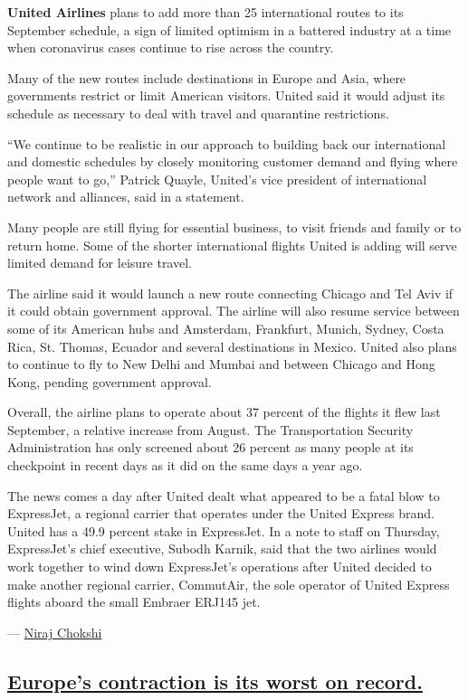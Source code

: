 \textbf{United Airlines} plans to add more than 25 international routes
to its September schedule, a sign of limited optimism in a battered
industry at a time when coronavirus cases continue to rise across the
country.

Many of the new routes include destinations in Europe and Asia, where
governments restrict or limit American visitors. United said it would
adjust its schedule as necessary to deal with travel and quarantine
restrictions.

``We continue to be realistic in our approach to building back our
international and domestic schedules by closely monitoring customer
demand and flying where people want to go,'' Patrick Quayle, United's
vice president of international network and alliances, said in a
statement.

Many people are still flying for essential business, to visit friends
and family or to return home. Some of the shorter international flights
United is adding will serve limited demand for leisure travel.

The airline said it would launch a new route connecting Chicago and Tel
Aviv if it could obtain government approval. The airline will also
resume service between some of its American hubs and Amsterdam,
Frankfurt, Munich, Sydney, Costa Rica, St. Thomas, Ecuador and several
destinations in Mexico. United also plans to continue to fly to New
Delhi and Mumbai and between Chicago and Hong Kong, pending government
approval.

Overall, the airline plans to operate about 37 percent of the flights it
flew last September, a relative increase from August. The Transportation
Security Administration has only screened about 26 percent as many
people at its checkpoint in recent days as it did on the same days a
year ago.

The news comes a day after United dealt what appeared to be a fatal blow
to ExpressJet, a regional carrier that operates under the United Express
brand. United has a 49.9 percent stake in ExpressJet. In a note to staff
on Thursday, ExpressJet's chief executive, Subodh Karnik, said that the
two airlines would work together to wind down ExpressJet's operations
after United decided to make another regional carrier, CommutAir, the
sole operator of United Express flights aboard the small Embraer ERJ145
jet.

--- \href{https://www.nytimes.com/by/niraj-chokshi}{Niraj Chokshi}

\hypertarget{europes-contraction-is-its-worst-on-record}{%
\subsection{\texorpdfstring{\protect\hyperlink{europes-contraction-is-its-worst-on-record}{Europe's
contraction is its worst on
record.}}{Europe's contraction is its worst on record.}}\label{europes-contraction-is-its-worst-on-record}}

